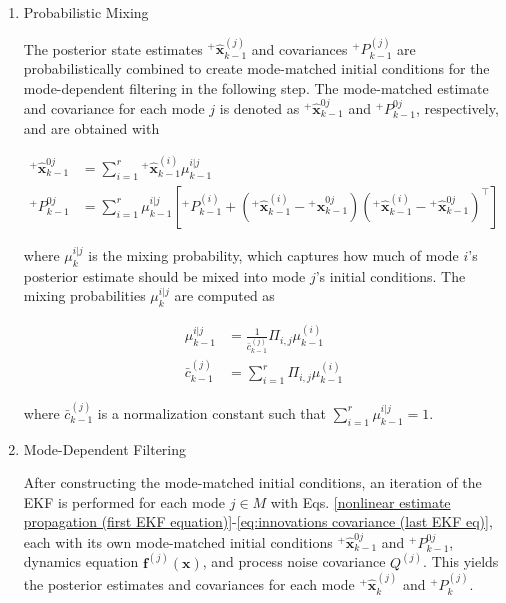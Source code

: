 \documentclass[letterpaper, preprint, paper,11pt]{AAS}	%
\begin{document}
\begin{enumerate}
    \item Probabilistic Mixing

    The posterior state estimates ${}^+\hat{\bm{x}}_{k-1}^{(j)}$ and covariances ${}^+P_{k-1}^{(j)}$ are probabilistically combined to create mode-matched initial conditions for the mode-dependent filtering in the following step. The mode-matched estimate and covariance for each mode $j$ is denoted as ${}^{+}\hat{\bm{x}}_{k-1}^{0j}$ and ${}^+P_{k-1}^{0j}$, respectively, and are obtained with

    \begin{align}
        {}^+\hat{\bm{x}}_{k-1}^{0j} &= \sum_{i=1}^r {}^+\hat{\bm{x}}_{k-1}^{(i)} \mu_{k-1}^{i|j} \\
        {}^+P_{k-1}^{0j} &= \sum_{i=1}^r  \mu_{k-1}^{i|j} [{}^+P_{k-1}^{(i)} + ({}^+\bm{\hat{x}}_{k-1}^{(i)} - {}^+\bm{\hat{x}}_{k-1}^{0j})({}^+\bm{\hat{x}}_{k-1}^{(i)} - {}^+\bm{\hat{x}}_{k-1}^{0j})^\top ]
    \end{align}

    \noindent where $\mu_k^{i|j}$ is the mixing probability, which captures how much of mode $i$'s posterior estimate should be mixed into mode $j$'s initial conditions. The mixing probabilities $\mu_k^{i|j}$ are computed as

    \begin{align}
        \mu_{k-1}^{i|j} &= \frac{1}{\bar{c}_{k-1}^{(j)}} \Pi_{i,j} \mu_{k-1}^{(i)} \\
        \bar{c}_{k-1}^{(j)} &= \sum_{i=1}^r \Pi_{i,j} \mu_{k-1}^{(i)} \label{mixing probability constant}
    \end{align}

    \noindent where $\bar{c}_{k-1}^{(j)}$ is a normalization constant such that $\sum_{i=1}^r \mu_{k-1}^{i|j} = 1$.
    
    \item Mode-Dependent Filtering

    After constructing the mode-matched initial conditions, an iteration of the EKF is performed for each mode $j \in M$ with Eqs. \ref{nonlinear estimate propagation (first EKF equation)}-\ref{eq:innovations covariance (last EKF eq)}, each with its own mode-matched initial conditions ${}^+\bm{\hat{x}}_{k-1}^{0j}$ and ${}^+P_{k-1}^{0j}$, dynamics equation $\bm{f}^{(j)}(\bm{x})$, and process noise covariance $Q^{(j)}$. This yields the posterior estimates and covariances for each mode ${}^+\hat{\bm{x}}_k^{(j)}$ and ${}^+P_k^{(j)}$.


\end{enumerate}
\end{document}
